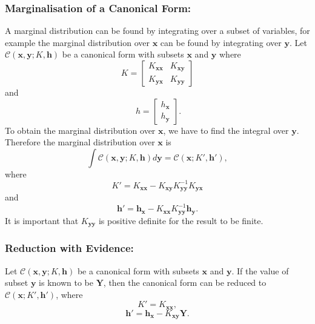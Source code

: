 \documentclass[12pt,oneside,openany,a4paper, %
afrikaans,english,
]{memoir}
\numberwithin{equation}{chapter}
\begin{document}
{\subsubsection{Marginalisation of a Canonical Form:}
A marginal distribution can be found by integrating over a subset of variables, for example the marginal distribution over $\bm{x}$ can be found by integrating over $\bm{y}$. Let $\mathcal{C}(\bm{x},\bm{y};K,\bm{h})$ be a canonical form with subsets $\bm{x}$ and $\bm{y}$ where
\begin{equation}
K = 
\begin{bmatrix}
K_{\bm{xx}} & K_{\bm{xy}}\\
K_{\bm{yx}} & K_{\bm{yy}}
\end{bmatrix}
\end{equation}
and
\begin{equation}
\ h = 
\begin{bmatrix}
h_{\bm{x}} \\
h_{\bm{y}}
\end{bmatrix}.
\end{equation}
To obtain the marginal distribution over $\bm{x}$, we have to find the integral over $\bm{y}$. Therefore the marginal distribution over $\bm{x}$ is
\begin{equation}
\int\mathcal{C}(\bm{x},\bm{y};K,\bm{h})d\bm{y} = \mathcal{C}(\bm{x};K',\bm{h}'),
\end{equation}
 where
\begin{equation}
K' = K_{\bm{xx}} - K_{\bm{xy}}K_{\bm{yy}}^{-1}K_{\bm{yx}}
\end{equation}
and
\begin{equation}
\bm{h'} = \bm{h}_{\bm{x}} - K_{\bm{xx}}K_{\bm{yy}}^{-1}\bm{h}_{\bm{y}}.
\end{equation}
It is important that $K_{\bm{yy}}$ is positive definite for the result to be finite.
\subsubsection{Reduction with Evidence:}
Let $\mathcal{C}(\bm{x},\bm{y};K,\bm{h})$ be a canonical form with subsets $\bm{x}$ and $\bm{y}$. If the value of subset $\bm{y}$ is known to be $\bm{Y}$, then the canonical form can be reduced to $\mathcal{C}(\bm{x}; K',\bm{h}')$, where
\begin{equation}
K' = K_{\bm{xx}},
\end{equation}
\begin{equation}
\bm{h'} = \bm{h}_{\bm{x}} - K_{\bm{xy}}\bm{Y}.
\end{equation}

}
\end{document}
